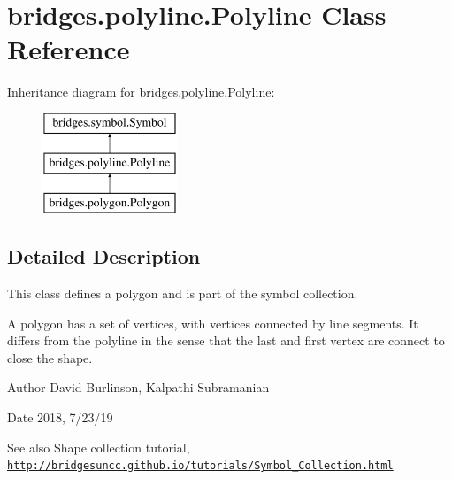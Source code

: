\hypertarget{classbridges_1_1polyline_1_1_polyline}{}\section{bridges.\+polyline.\+Polyline Class Reference}
\label{classbridges_1_1polyline_1_1_polyline}
Inheritance diagram for bridges.\+polyline.\+Polyline\+:\begin{figure}[H]
\begin{center}
\leavevmode
\includegraphics[height=3.000000cm]{classbridges_1_1polyline_1_1_polyline}
\end{center}
\end{figure}


\subsection{Detailed Description}
This class defines a polygon and is part of the symbol collection. 

A polygon has a set of vertices, with vertices connected by line segments. It differs from the polyline in the sense that the last and first vertex are connect to close the shape.

\begin{DoxyAuthor}{Author}
David Burlinson, Kalpathi Subramanian
\end{DoxyAuthor}
\begin{DoxyDate}{Date}
2018, 7/23/19
\end{DoxyDate}
\begin{DoxySeeAlso}{See also}
Shape collection tutorial, \href{http://bridgesuncc.github.io/tutorials/Symbol_Collection.html}{\tt http\+://bridgesuncc.\+github.\+io/tutorials/\+Symbol\+\_\+\+Collection.\+html} 
\end{DoxySeeAlso}
